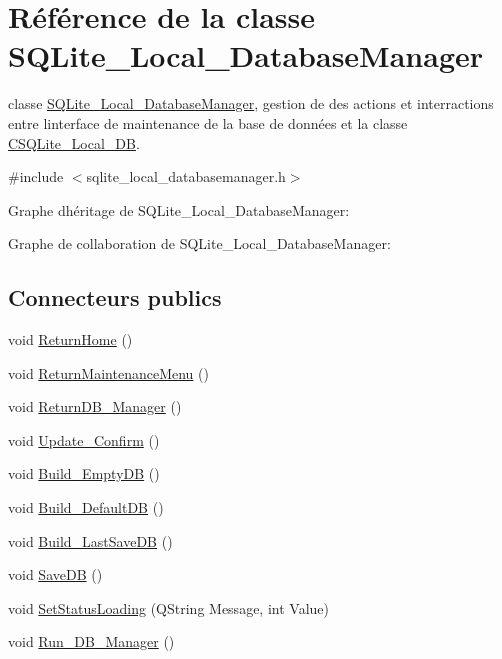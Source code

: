 \hypertarget{class_s_q_lite___local___database_manager}{}\section{Référence de la classe S\+Q\+Lite\+\_\+\+Local\+\_\+\+Database\+Manager}
\label{class_s_q_lite___local___database_manager}


classe \hyperlink{class_s_q_lite___local___database_manager}{S\+Q\+Lite\+\_\+\+Local\+\_\+\+Database\+Manager}, gestion de des actions et interractions entre l\textquotesingle{}interface de maintenance de la base de données et la classe \hyperlink{class_c_s_q_lite___local___d_b}{C\+S\+Q\+Lite\+\_\+\+Local\+\_\+\+D\+B}.  




{\ttfamily \#include $<$sqlite\+\_\+local\+\_\+databasemanager.\+h$>$}



Graphe d\textquotesingle{}héritage de S\+Q\+Lite\+\_\+\+Local\+\_\+\+Database\+Manager\+:


Graphe de collaboration de S\+Q\+Lite\+\_\+\+Local\+\_\+\+Database\+Manager\+:
\subsection*{Connecteurs publics}
\begin{DoxyCompactItemize}
\item 
void \hyperlink{class_s_q_lite___local___database_manager_acc8524a6da38c01831b2eb49cea93f31}{Return\+Home} ()
\item 
void \hyperlink{class_s_q_lite___local___database_manager_ab621325d2356d4f84a14103330db995d}{Return\+Maintenance\+Menu} ()
\item 
void \hyperlink{class_s_q_lite___local___database_manager_af88296139c7f7e4a138c4e0b31b927ae}{Return\+D\+B\+\_\+\+Manager} ()
\item 
void \hyperlink{class_s_q_lite___local___database_manager_a50748c0637b4f3813b48c227131cd4b5}{Update\+\_\+\+Confirm} ()
\item 
void \hyperlink{class_s_q_lite___local___database_manager_afa2f66b2d03bf43b24db6f72fc114e08}{Build\+\_\+\+Empty\+D\+B} ()
\item 
void \hyperlink{class_s_q_lite___local___database_manager_a5180b95c68728a20b0db7c5e1411911d}{Build\+\_\+\+Default\+D\+B} ()
\item 
void \hyperlink{class_s_q_lite___local___database_manager_a2b9b89237cd56d54643a0761aa1a9cd5}{Build\+\_\+\+Last\+Save\+D\+B} ()
\item 
void \hyperlink{class_s_q_lite___local___database_manager_a4d253cf3d01eaf2626032cef48923788}{Save\+D\+B} ()
\item 
void \hyperlink{class_s_q_lite___local___database_manager_ac0c01f2c96affa62a10f896c0b1baf29}{Set\+Status\+Loading} (Q\+String Message, int Value)
\item 
void \hyperlink{class_s_q_lite___local___database_manager_a8399bba68cd862681cb912dfaa70686d}{Run\+\_\+\+D\+B\+\_\+\+Manager} ()
\end{DoxyCompactItemize}
